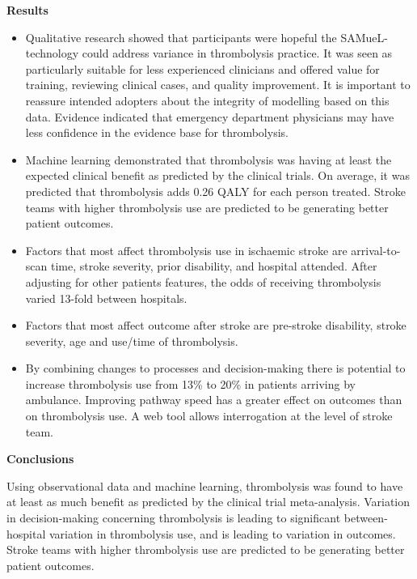 \textbf{Results}

\begin{itemize}

    \item Qualitative research showed that participants were hopeful the SAMueL-technology could address variance in thrombolysis practice. It was seen as particularly suitable for less experienced clinicians and offered value for training, reviewing clinical cases, and quality improvement. It is important to reassure intended adopters about the integrity of modelling based on this data. Evidence indicated that emergency department physicians may have less confidence in the evidence base for thrombolysis.
    
    \item Machine learning demonstrated that thrombolysis was having at least the expected clinical benefit as predicted by the clinical trials. On average, it was predicted that thrombolysis adds 0.26 QALY for each person treated. Stroke teams with higher thrombolysis use are predicted to be generating better patient outcomes.
    
    \item Factors that most affect thrombolysis use in ischaemic stroke are arrival-to-scan time, stroke severity, prior disability, and hospital attended. After adjusting for other patients features, the odds of receiving thrombolysis varied 13-fold between hospitals.
    
    \item Factors  that most affect outcome after stroke are pre-stroke disability, stroke severity, age and use/time of thrombolysis.
    
    \item By combining changes to processes and decision-making there is potential to increase thrombolysis use from 13\% to 20\% in patients arriving by ambulance. Improving pathway speed has a greater effect on outcomes than on thrombolysis use. A web tool allows interrogation at the level of stroke team.
\end{itemize}


\textbf{Conclusions}

Using observational data and machine learning, thrombolysis was found to have at least as much benefit as predicted by the clinical trial meta-analysis. Variation in decision-making concerning thrombolysis is leading to significant between-hospital variation in thrombolysis use, and is leading to variation in outcomes. Stroke teams with higher thrombolysis use are predicted to be generating better patient outcomes. 

